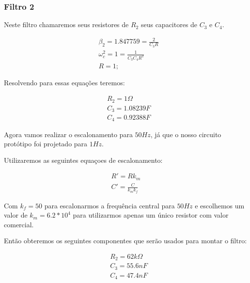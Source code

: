 \documentclass[12pt,twoside, a4paper, twocolumn]{article}
\begin{document}
\subsubsection{Filtro 2}


Neste filtro chamaremos seus resistores de $R_2$ seus capacitores de $C_3$ e $C_4$.


\begin{equation}
    \begin{aligned}
         & \beta_2 = 1.847759 = \frac{2}{C_3 R}   \\
         & \omega_c^2 = 1 = \frac{1}{C_3 C_4 R^2} \\
         & R = 1;
    \end{aligned}
\end{equation}


Resolvendo para essas equações teremos:


\begin{equation}
    \begin{aligned}
         & R_2 = 1 \varOmega \\
         & C_3 = 1.08239 F   \\
         & C_4 = 0.92388 F
    \end{aligned}
\end{equation}


Agora vamos realizar o escalonamento para $50Hz$, já que o nosso circuito protótipo foi projetado para $1Hz$.


Utilizaremos as seguintes equaçoes de escalonamento:


\begin{equation}
    \begin{aligned}
        R' = R  k_m \\
        C' = \frac{C}{k_m k_f}
    \end{aligned}
\end{equation}


Com $k_f = 50$ para escalonarmos a frequência central para $50Hz$ e escolhemos um valor de $k_m = 6.2 * 10^4$ para utilizarmos apenas um único resistor com valor comercial.


Então obteremos os seguintes componentes que serão usados para montar o filtro:


\begin{equation}
    \begin{aligned}
         & R_2 = 62k \varOmega \\
         & C_3 = 55.6 nF       \\
         & C_4 = 47.4 nF
    \end{aligned}
\end{equation}
\end{document}
